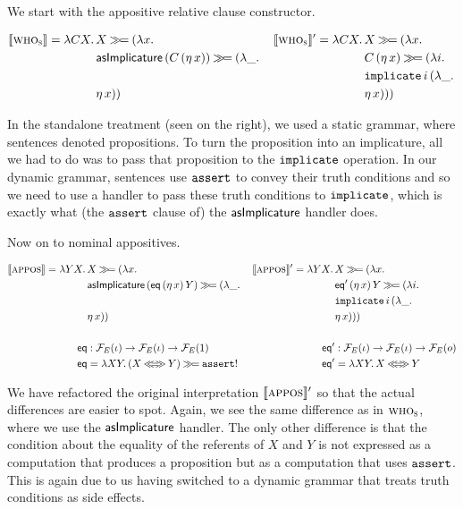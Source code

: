 We start with the appositive relative clause constructor.

\begin{align*}
  \llbracket \textsc{who}_{\textsc{s}} \rrbracket = \lambda C X.\, 
      &X \mathbin{\gg\!=} (\lambda x.\, 
 &\llbracket \textsc{who}_{\textsc{s}} \rrbracket' = \lambda C X.\, 
      &X \mathbin{\gg\!=} (\lambda x.\,  \\
      &\mathsf{asImplicature}\,(C\,(\eta\,x)) \mathbin{\gg\!=} (\lambda \_.\, 
     &&C\,(\eta\,x) \mathbin{\gg\!=} (\lambda i.\,  \\
      &
     &&\mathtt{implicate}\,i\,(\lambda \_.\,  \\
      &\eta\,x))
     &&\eta\,x)))
\end{align*}

In the standalone treatment (seen on the right), we used a static grammar,
where sentences denoted propositions. To turn the proposition into an
implicature, all we had to do was to pass that proposition to the
$\mathtt{implicate}$ operation. In our dynamic grammar, sentences use
$\mathtt{assert}$ to convey their truth conditions and so we need to use a
handler to pass these truth conditions to $\mathtt{implicate}$, which is
exactly what (the $\mathtt{assert}$ clause of) the $\mathsf{asImplicature}$ handler
does.

Now on to nominal appositives.

\begin{align*}
  \sem{\abs{appos}} = \lam{Y X}{
    &X \hsbind (\lam{x}{
 &\sem{\abs{appos}}' = \lam{Y X}{
    &X \hsbind (\lam{x}{ \\
    &\ap{\asImplicature}{(\app{\eq}{(\etaE{x})}{Y})} \hsbind (\lam{\_}{
   &&\app{\eq'}{(\etaE{x})}{Y} \hsbind (\lam{i}{ \\
    &
   &&\app{\op{implicate}}{i}{(\lam{\_}{ \\
    &\etaE{x}})})}
   &&\etaE{x}})}})})} \\
  \\
  \eq  &: \FF_E(\iota) \to \FF_E(\iota) \to \FF_E(1)
 &\eq' &: \FF_E(\iota) \to \FF_E(\iota) \to \FF_E(o) \\
  \eq  &= \lam{X Y}{(X \eqlr Y) \hsbind \op{assert}!}
 &\eq' &= \lam{X Y}{X \eqlr Y}
\end{align*}

We have refactored the original interpretation $\llbracket \textsc{appos} \rrbracket'$ so that
the actual differences are easier to spot. Again, we see the same
difference as in $\textsc{who}_{\textsc{s}}$, where we use the $\mathsf{asImplicature}$
handler. The only other difference is that the condition about the equality
of the referents of $X$ and $Y$ is not expressed as a computation that
produces a proposition but as a computation that uses $\mathtt{assert}$. This
is again due to us having switched to a dynamic grammar that treats truth
conditions as side effects.

